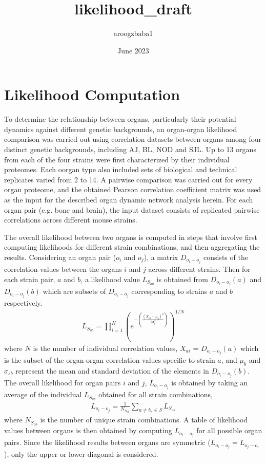 \documentclass{article}
\title{likelihood_draft}
\author{aroogzbaba1 }
\date{June 2023}
\begin{document}

\section{Likelihood Computation}

To determine the relationship between organs, particularly their potential dynamics against different genetic backgrounds,  an organ-organ likelihood comparison was carried out using correlation datasets between organs among four distinct genetic backgrounds, including AJ, BL, NOD and SJL.
Up to 13 organs from each of the four strains were first characterized by their individual proteomes. Each oorgan type also included sets of biological and technical replicates varied from 2 to 14. 
A pairwise comparison  was carried out for every organ proteome, and the obtained Pearson correlation coefficient matrix was used as the input for the described organ dynamic network analysis herein.
For each organ pair (e.g. bone and brain),  the input dataset consists of replicated pairwise correlations across different mouse strains.

The overall likelihood between two organs is computed in steps that involve first computing likelihoods for different strain combinations, and then aggregating the results. %
Considering an organ pair ($o_i$ and $o_j$), a matrix $D_{o_i-o_j}$  consists of the correlation values between the organs $i$ and $j$ across different strains. Then for each strain pair, $a$ and $b$, a likelihood value $L_{S_{ab}}$ is obtained from $D_{o_i-o_j}(a)$  and $D_{o_i-o_j}(b)$  which are subsets of $D_{o_i-o_j}$ corresponding to strains $a$ and $b$ respectively.
  \begin{align}
      L_{S_{ab}}  = \prod_{i=1}^N (e^{-(\frac{(X_{ai} - \mu_{b})^2}{2\sigma_{b}^2})})^{1/N}
  \end{align}
where $N$ is the number of individual correlation values, $X_{ai}$ = $D_{o_i-o_j}(a)$ which is the subset of the organ-organ correlation values specific to strain $a$, and $\mu_{b}$ and $\sigma_{sb}$ represent the mean and standard deviation of the elements in $D_{o_i-o_j}(b)$. The overall likelihood for organ pairs $i$ and $j$, $L_{o_i-o_j}$ is obtained by taking an average of the individual $L_{S_{ab}}$ obtained for all strain combinations,
\begin{align}
    L_{o_i-o_j} = \frac{1}{N_{S_{ab}}} \sum_{a \ne b, \in S} L_{S_{ab}}
\end{align}
where $N_{S_{ab}}$ is the number of unique strain combinations. 
A table of likelihood values between organs is then obtained by computing $L_{o_i-o_j}$ for all possible organ pairs. Since the likelihood results between organs are symmetric ($L_{o_i-o_j} = L_{o_j-o_i}$), only the upper or lower diagonal is considered.
\end{document}
